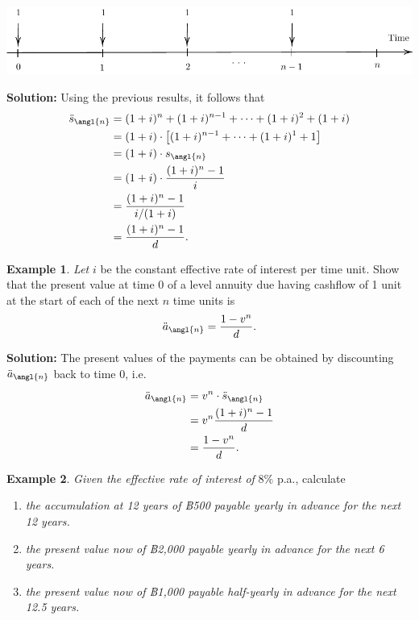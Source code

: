 \documentclass[
]{book}
\theoremstyle{definition}
\theoremstyle{definition}
\newtheorem{example}{Example}[chapter]
\theoremstyle{definition}
\theoremstyle{definition}
\theoremstyle{remark}
\begin{document}
\begin{center}\includegraphics{SCMA266Bookdownproj_files/figure-latex/tikz-ex16-1} \end{center}

\textbf{Solution:} Using the previous results, it follows that
\[\begin{aligned}
 \ddot{s}_\angl{n} &= (1+i)^n + (1+i)^{n-1} + \cdots + (1+i)^2 + (1+i) \\
            &= (1+i) \cdot \left[(1+i)^{n-1} + \cdots + (1+i)^1 + 1\right] \\
            &= (1+i) \cdot {s}_\angl{n} \\
            &= (1+i) \cdot \frac{(1+i)^n -1 }{i}\\
            &=  \frac{(1+i)^n -1 }{i/(1+i)}\\
            &=  \frac{(1+i)^n -1 }{d}.\end{aligned}\]

\begin{example}
\emph{Let} \(i\) be the constant effective rate of interest per time unit. Show
that the present value at time 0 of a level annuity due having cashflow
of 1 unit at the start of each of the next \(n\) time units is
\[\ddot{a}_\angl{n} =  \frac{1 - v^n }{d}.\]
\end{example}

\textbf{Solution:} The present values of the payments can be obtained by
discounting \(\ddot{a}_\angl{n}\) back to time 0, i.e.~\[\begin{aligned}
 \ddot{a}_\angl{n} &= v^n  \cdot  \ddot{s}_\angl{n} \\
            &= v^n  \frac{(1+i)^n -1 }{d} \\
            &=\frac{1 - v^n}{d}.\end{aligned}\]

\begin{example}

\emph{Given the effective rate of interest of} \(8\%\) p.a., calculate

\begin{enumerate}
\def\labelenumi{\arabic{enumi}.}
\item
  \emph{the accumulation at 12 years of ฿500 payable yearly in advance for
  the next 12 years.}
\item
  \emph{the present value now of ฿2,000 payable yearly in advance for the
  next 6 years.}
\item
  \emph{the present value now of ฿1,000 payable half-yearly in advance for
  the next 12.5 years.}
\end{enumerate}

\end{example}
\end{document}
